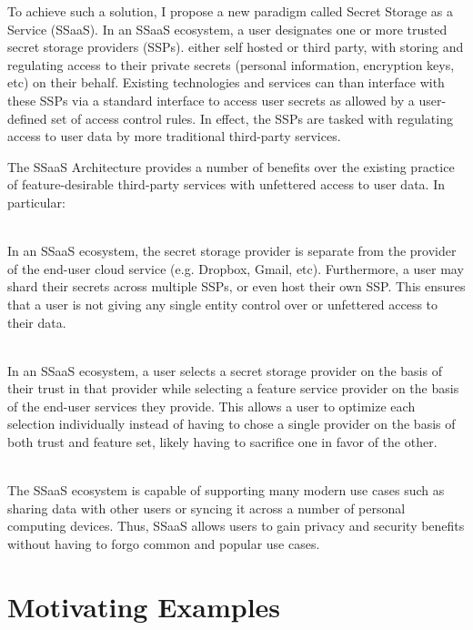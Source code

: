 To achieve such a solution, I propose a new paradigm called Secret
Storage as a Service (SSaaS). In an SSaaS ecosystem, a user designates
one or more trusted secret storage providers (SSPs). either self
hosted or third party, with storing and regulating access to their
private secrets (personal information, encryption keys, etc) on their
behalf. Existing technologies and services can than interface with
these SSPs via a standard interface to access user secrets as allowed
by a user-defined set of access control rules. In effect, the SSPs are
tasked with regulating access to user data by more traditional
third-party services.

The SSaaS Architecture provides a number of benefits over the existing
practice of feature-desirable third-party services with unfettered
access to user data. In particular:

\begin{packed_desc}
\item[No Single Trusted Third Party] \hfill \\ In an SSaaS ecosystem,
  the secret storage provider is separate from the provider of the
  end-user cloud service (e.g. Dropbox, Gmail, etc). Furthermore, a
  user may shard their secrets across multiple SSPs, or even host
  their own SSP. This ensures that a user is not giving any single
  entity control over or unfettered access to their data.
\item[Separation of Duties] \hfill \\ In an SSaaS ecosystem, a user
  selects a secret storage provider on the basis of their trust in
  that provider while selecting a feature service provider on the
  basis of the end-user services they provide. This allows a user to
  optimize each selection individually instead of having to chose a
  single provider on the basis of both trust and feature set, likely
  having to sacrifice one in favor of the other.
\item[Support for Existing Use Cases] \hfill \\ The SSaaS ecosystem is
  capable of supporting many modern use cases such as sharing data
  with other users or syncing it across a number of personal computing
  devices. Thus, SSaaS allows users to gain privacy and security
  benefits without having to forgo common and popular use cases.
\end{packed_desc}

\section{Motivating Examples}

